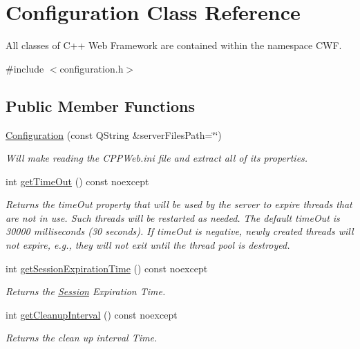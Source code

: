 \hypertarget{class_configuration}{}\section{Configuration Class Reference}
\label{class_configuration}


All classes of C++ Web Framework are contained within the namespace C\+WF.  




{\ttfamily \#include $<$configuration.\+h$>$}

\subsection*{Public Member Functions}
\begin{DoxyCompactItemize}
\item 
\hyperlink{class_configuration_a60b4858740fb32114fa5f4e72577fa7a}{Configuration} (const Q\+String \&server\+Files\+Path=\char`\"{}\char`\"{})
\begin{DoxyCompactList}\small\item\em Will make reading the C\+P\+P\+Web.\+ini file and extract all of its properties. \end{DoxyCompactList}\item 
int \hyperlink{class_configuration_ab39a76ac734b52df96c9c07f71764ae2}{get\+Time\+Out} () const noexcept
\begin{DoxyCompactList}\small\item\em Returns the time\+Out property that will be used by the server to expire threads that are not in use. Such threads will be restarted as needed. The default time\+Out is 30000 milliseconds (30 seconds). If time\+Out is negative, newly created threads will not expire, e.\+g., they will not exit until the thread pool is destroyed. \end{DoxyCompactList}\item 
int \hyperlink{class_configuration_a56f953d35c709126b15603071b4132ab}{get\+Session\+Expiration\+Time} () const noexcept
\begin{DoxyCompactList}\small\item\em Returns the \hyperlink{class_session}{Session} Expiration Time. \end{DoxyCompactList}\item 
int \hyperlink{class_configuration_a7a761377328a3212a8387d033282b78e}{get\+Cleanup\+Interval} () const noexcept
\begin{DoxyCompactList}\small\item\em Returns the clean up interval Time. \end{DoxyCompactList}\item 

\end{DoxyCompactItemize}
